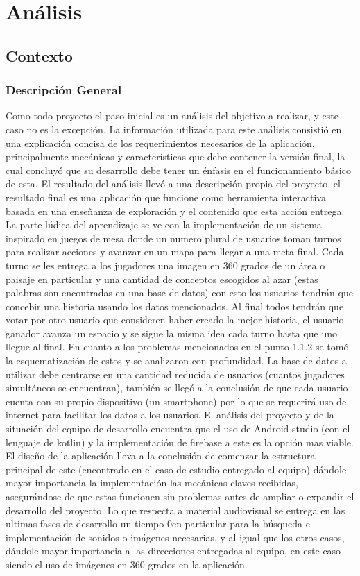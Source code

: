 \section{Análisis}

\subsection{Contexto}
\subsubsection{Descripción General}
Como todo proyecto el paso inicial es un análisis del objetivo a realizar, y este caso no es la excepción. La información utilizada para este análisis consistió en una explicación concisa de los requerimientos necesarios de la aplicación, principalmente mecánicas y características que debe contener la versión final, la cual concluyó que su desarrollo debe tener un énfasis en el funcionamiento básico de esta.
El resultado del análisis llevó a una descripción propia del proyecto, el resultado final es una aplicación que funcione como herramienta interactiva basada en una enseñanza de exploración y el contenido que esta acción entrega. La parte lúdica del aprendizaje se ve con la implementación de un sistema inspirado en juegos de mesa donde un numero plural de usuarios toman turnos para realizar acciones y avanzar en un mapa para llegar a una meta final. Cada turno se les entrega a los jugadores una imagen en 360 grados de un área o paisaje en particular y una cantidad de conceptos escogidos al azar (estas palabras son encontradas en una base de datos) con esto los usuarios tendrán que concebir una historia usando los datos mencionados. Al final todos tendrán que votar por otro usuario que consideren haber creado la mejor historia, el usuario ganador avanza un espacio y se sigue la misma idea cada turno hasta que uno llegue al final.
En cuanto a los problemas mencionados en el punto 1.1.2 se tomó la esquematización de estos y se analizaron con profundidad. La base de datos a utilizar debe centrarse en una cantidad reducida de usuarios (cuantos jugadores simultáneos se encuentran), también se llegó a la conclusión de que cada usuario cuenta con su propio dispositivo (un smartphone) por lo que se requerirá uso de internet para facilitar los datos a los usuarios. El análisis del proyecto y de la situación del equipo de desarrollo encuentra que el uso de Android studio (con el lenguaje de kotlin) y la implementación de firebase a este es la opción mas viable. 
El diseño de la aplicación lleva a la conclusión de comenzar la estructura principal de este (encontrado en el caso de estudio entregado al equipo) dándole mayor importancia la implementación las mecánicas claves recibidas, asegurándose de que estas funcionen sin problemas antes de ampliar o expandir el desarrollo del proyecto.
Lo que respecta a material audiovisual se entrega en las ultimas fases de desarrollo un tiempo 0en particular para la búsqueda e implementación de sonidos o imágenes necesarias, y al igual que los otros casos, dándole mayor importancia a las direcciones entregadas al equipo, en este caso siendo el uso de imágenes en 360 grados en la aplicación.

